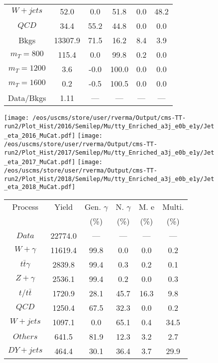 \begin{figure}
\begin{minipage}[c]{0.32\textwidth}
{\begin{tabular}{cccccc}
$ W+jets $ &  52.0 &  0.0 &  51.8 &  0.0 &  48.2\\
$ QCD $ &  34.4 &  55.2 &  44.8 &  0.0 &  0.0\\
Bkgs &  13307.9 &  71.5 &  16.2 &  8.4 &  3.9\\
$ m_{T} = 800 $ &  115.4 &  0.0 &  99.8 &  0.2 &  0.0\\
$ m_{T} = 1200 $ &  3.6 &  -0.0 &  100.0 &  0.0 &  0.0\\
$ m_{T} = 1600 $ &  0.2 &  -0.5 &  100.5 &  0.0 &  0.0\\
Data/Bkgs &  1.11 &  --- &  --- &  --- &  ---\\
\hline
\end{tabular}
}
\end{minipage}
\end{figure}

\begin{figure}
\centering
\texttt{[image: /eos/uscms/store/user/rverma/Output/cms-TT-run2/Plot\_Hist/2016/Semilep/Mu/tty\_Enriched\_a3j\_e0b\_e1y/Jet\_eta\_2016\_MuCat.pdf]}
\texttt{[image: /eos/uscms/store/user/rverma/Output/cms-TT-run2/Plot\_Hist/2017/Semilep/Mu/tty\_Enriched\_a3j\_e0b\_e1y/Jet\_eta\_2017\_MuCat.pdf]}
\texttt{[image: /eos/uscms/store/user/rverma/Output/cms-TT-run2/Plot\_Hist/2018/Semilep/Mu/tty\_Enriched\_a3j\_e0b\_e1y/Jet\_eta\_2018\_MuCat.pdf]}
\begin{minipage}[c]{0.32\textwidth}
\centering
\tiny{
\begin{tabular}{cccccc}
\hline
Process & Yield & Gen. $\gamma$ & N. $\gamma$ & M. e & Multi. \\
 &  & (\%) & (\%) & (\%) & (\%)  \\
\hline
                                                                      $ Data $ &  22774.0 &  --- &  --- &  --- &  ---\\
$ W+\gamma $ &  11619.4 &  99.8 &  0.0 &  0.0 &  0.2\\
$ t\bar{t}\gamma $ &  2839.8 &  99.4 &  0.3 &  0.2 &  0.1\\
$ Z+\gamma $ &  2536.1 &  99.4 &  0.2 &  0.0 &  0.3\\
$ t/t\bar{t} $ &  1720.9 &  28.1 &  45.7 &  16.3 &  9.8\\
$ QCD $ &  1250.4 &  67.5 &  32.3 &  0.0 &  0.2\\
$ W+jets $ &  1097.1 &  0.0 &  65.1 &  0.4 &  34.5\\
$ Others $ &  641.5 &  81.9 &  12.3 &  3.2 &  2.7\\
$ DY+jets $ &  464.4 &  30.1 &  36.4 &  3.7 &  29.9\\

\end{tabular}}
\end{minipage}
\end{figure}
